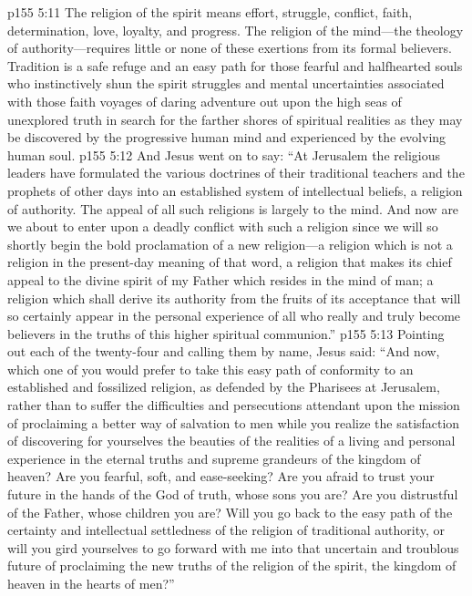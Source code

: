 \vs p155 5:11 The religion of the spirit means effort, struggle, conflict, faith, determination, love, loyalty, and progress. The religion of the mind---the theology of authority---requires little or none of these exertions from its formal believers. Tradition is a safe refuge and an easy path for those fearful and halfhearted souls who instinctively shun the spirit struggles and mental uncertainties associated with those faith voyages of daring adventure out upon the high seas of unexplored truth in search for the farther shores of spiritual realities as they may be discovered by the progressive human mind and experienced by the evolving human soul.
\pc \vs p155 5:12 And Jesus went on to say: \textcolor{ubdarkred}{“At Jerusalem the religious leaders have formulated the various doctrines of their traditional teachers and the prophets of other days into an established system of intellectual beliefs, a religion of authority. The appeal of all such religions is largely to the mind. And now are we about to enter upon a deadly conflict with such a religion since we will so shortly begin the bold proclamation of a new religion---a religion which is not a religion in the present\hyp{}day meaning of that word, a religion that makes its chief appeal to the divine spirit of my Father which resides in the mind of man; a religion which shall derive its authority from the fruits of its acceptance that will so certainly appear in the personal experience of all who really and truly become believers in the truths of this higher spiritual communion.”}
\vs p155 5:13 Pointing out each of the twenty\hyp{}four and calling them by name, Jesus said: \textcolor{ubdarkred}{“And now, which one of you would prefer to take this easy path of conformity to an established and fossilized religion, as defended by the Pharisees at Jerusalem, rather than to suffer the difficulties and persecutions attendant upon the mission of proclaiming a better way of salvation to men while you realize the satisfaction of discovering for yourselves the beauties of the realities of a living and personal experience in the eternal truths and supreme grandeurs of the kingdom of heaven? Are you fearful, soft, and ease\hyp{}seeking? Are you afraid to trust your future in the hands of the God of truth, whose sons you are? Are you distrustful of the Father, whose children you are? Will you go back to the easy path of the certainty and intellectual settledness of the religion of traditional authority, or will you gird yourselves to go forward with me into that uncertain and troublous future of proclaiming the new truths of the religion of the spirit, the kingdom of heaven in the hearts of men?”}
